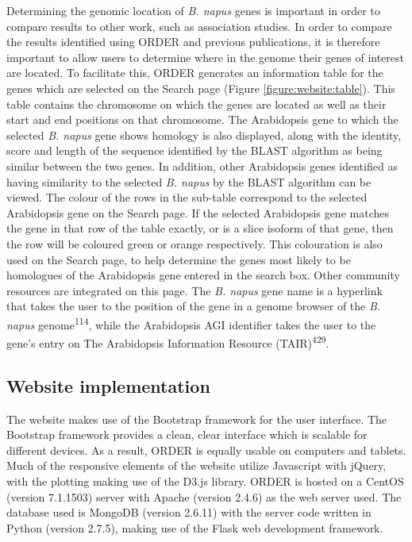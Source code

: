 \documentclass[12pt,]{book}
\begin{document}
Determining the genomic location of \emph{B. napus} genes is important
in order to compare results to other work, such as association studies.
In order to compare the results identified using ORDER and previous
publications, it is therefore important to allow users to determine
where in the genome their genes of interest are located. To facilitate
this, ORDER generates an information table for the genes which are
selected on the Search page (Figure \ref{figure:website:table}). This
table contains the chromosome on which the genes are located as well as
their start and end positions on that chromosome. The Arabidopsis gene
to which the selected \emph{B. napus} gene shows homology is also
displayed, along with the identity, score and length of the sequence
identified by the BLAST algorithm as being similar between the two
genes. In addition, other Arabidopsis genes identified as having
similarity to the selected \emph{B. napus} by the BLAST algorithm can be
viewed. The colour of the rows in the sub-table correspond to the
selected Arabidopsis gene on the Search page. If the selected
Arabidopsis gene matches the gene in that row of the table exactly, or
is a slice isoform of that gene, then the row will be coloured green or
orange respectively. This colouration is also used on the Search page,
to help determine the genes most likely to be homologues of the
Arabidopsis gene entered in the search box. Other community resources
are integrated on this page. The \emph{B. napus} gene name is a
hyperlink that takes the user to the position of the gene in a genome
browser of the \emph{B. napus} genome\textsuperscript{114}, while the
Arabidopsis AGI identifier takes the user to the gene's entry on The
Arabidopsis Information Resource (TAIR)\textsuperscript{429}.

\subsection{Website implementation}\label{website-implementation}

The website makes use of the Bootstrap framework for the user interface.
The Bootstrap framework provides a clean, clear interface which is
scalable for different devices. As a result, ORDER is equally usable on
computers and tablets. Much of the responsive elements of the website
utilize Javascript with jQuery, with the plotting making use of the
D3.js library. ORDER is hosted on a CentOS (version 7.1.1503) server
with Apache (version 2.4.6) as the web server used. The database used is
MongoDB (version 2.6.11) with the server code written in Python (version
2.7.5), making use of the Flask web development framework.
\end{document}
